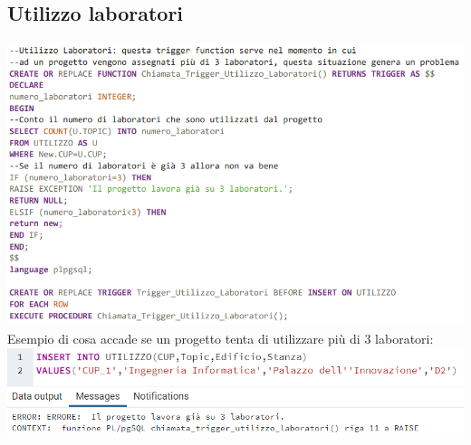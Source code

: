 \subsection{Utilizzo laboratori}
\includegraphics[width=1.1\textwidth]{Immagini/vincolo2.sql}
\newline\newline
Esempio di cosa accade se un progetto tenta di utilizzare più di 3 laboratori:
\newline\newline
\includegraphics[width=1.1\textwidth]{Immagini/vincolo2}
